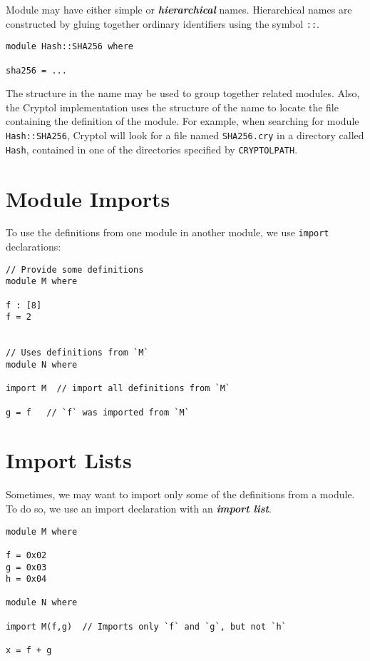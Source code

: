 Module may have either simple or \textbf{\emph{hierarchical}} names.
Hierarchical names are constructed by gluing together ordinary
identifiers using the symbol \texttt{::}.

\begin{verbatim}
module Hash::SHA256 where

sha256 = ...
\end{verbatim}

The structure in the name may be used to group together related modules.
Also, the Cryptol implementation uses the structure of the name to
locate the file containing the definition of the module. For example,
when searching for module \texttt{Hash::SHA256}, Cryptol will look for a
file named \texttt{SHA256.cry} in a directory called \texttt{Hash},
contained in one of the directories specified by \texttt{CRYPTOLPATH}.

\section{Module Imports}\label{module-imports}

To use the definitions from one module in another module, we use
\texttt{import} declarations:

\begin{verbatim}
// Provide some definitions
module M where

f : [8]
f = 2


// Uses definitions from `M`
module N where

import M  // import all definitions from `M`

g = f   // `f` was imported from `M`
\end{verbatim}

\section{Import Lists}\label{import-lists}

Sometimes, we may want to import only some of the definitions from a
module. To do so, we use an import declaration with an
\textbf{\emph{import list}}.

\begin{verbatim}
module M where

f = 0x02
g = 0x03
h = 0x04

module N where

import M(f,g)  // Imports only `f` and `g`, but not `h`

x = f + g
\end{verbatim}

